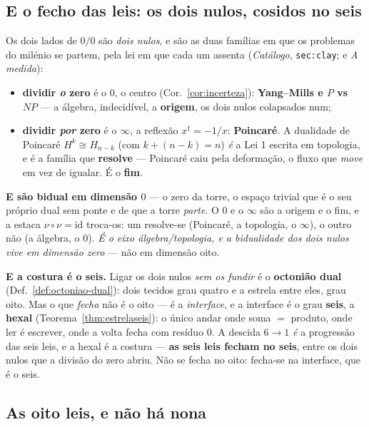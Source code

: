 \documentclass[11pt,a4paper]{article}
\newcommand{\code}[1]{\texttt{\small #1}}
\newcommand{\dg}{^{\dagger}}
\begin{document}
\subsection*{E o fecho das leis: os dois nulos, cosidos no seis}

Os dois lados de $0/0$ são \emph{dois nulos}, e são as duas famílias em que os problemas do milénio se
partem, pela lei em que cada um assenta (\emph{Catálogo}, \code{sec:clay}; e \emph{A medida}):
\begin{itemize}
\item \textbf{dividir \emph{o} zero} é o $0$, o centro (Cor.~\ref{cor:incerteza}): \textbf{Yang--Mills e
  $P$ vs $NP$} --- a álgebra, indecidível, a \textbf{origem}, os dois nulos colapsados num;
\item \textbf{dividir \emph{por} zero} é o $\infty$, a reflexão $x\dg=-1/x$: \textbf{Poincaré}. A
  dualidade de Poincaré $H^k\cong H_{n-k}$ (com $k+(n-k)=n$) \emph{é} a Lei 1 escrita em topologia, e é a
  família que \textbf{resolve} --- Poincaré caiu pela deformação, o fluxo que \emph{move} em vez de
  igualar. É o \textbf{fim}.
\end{itemize}
\textbf{E são bidual em dimensão $0$} --- o zero da torre, o espaço trivial que é o seu próprio dual sem
ponte e de que a torre \emph{parte}. O $0$ e o $\infty$ são a origem e o fim, e a estaca
$\nu\circ\nu=\mathrm{id}$ troca-os: um resolve-se (Poincaré, a topologia, o $\infty$), o outro não (a
álgebra, o $0$). \emph{É o eixo álgebra/topologia, e a bidualidade dos dois nulos vive em dimensão zero}
--- não em dimensão oito.

\textbf{E a costura é o seis.} Ligar os dois nulos \emph{sem os fundir} é o \textbf{octonião dual}
(Def.~\ref{def:octoniao-dual}): dois tecidos grau quatro e a estrela entre eles, grau oito. Mas o que
\emph{fecha} não é o oito --- é a \emph{interface}, e a interface é o grau \textbf{seis}, a
\textbf{hexal} (Teorema~\ref{thm:estrelaseis}): o único andar onde soma $=$ produto, onde ler é escrever,
onde a volta fecha com resíduo $0$. A descida $6\to1$ \emph{é} a progressão das seis leis, e a hexal é a
costura --- \textbf{as seis leis fecham no seis}, entre os dois nulos que a divisão do zero abriu. Não se
fecha no oito: fecha-se na interface, que é o seis.

\subsection*{As oito leis, e não há nona}\label{sub:oitoleis}
\end{document}
